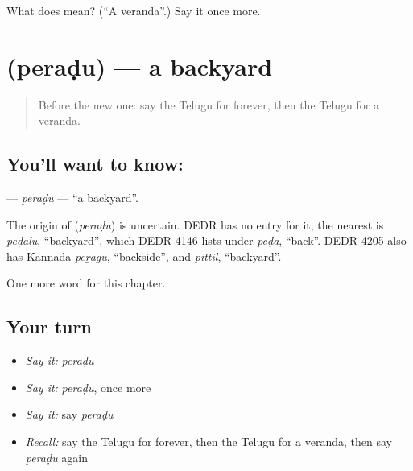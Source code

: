 \begin{tcolorbox}[breakable,colback=teal!4,colframe=teal!35!black,title={Before you move on}]
What does  mean? (\textquotedblleft{}A veranda\textquotedblright{}.) Say it once more.
\end{tcolorbox}
\section[\texorpdfstring{\te{పెరడు} (peraḍu)}{పెరడు (peraḍu)}]{ (peraḍu) — a backyard}

\label{lesson:TE-C173-peradu}



\begin{quote}
Before the new one: say the Telugu for forever, then the Telugu for a veranda.
\end{quote}

\subsection*{You'll want to know: }
\textbf{} — \emph{peraḍu} — \textquotedblleft{}a backyard\textquotedblright{}.

\begin{cousinweb}
The origin of \textbf{} (\emph{peraḍu}) is uncertain. DEDR has no entry for it; the nearest is \emph{peḍalu}, \textquotedblleft{}backyard\textquotedblright{}, which DEDR 4146 lists under \emph{peḍa}, \textquotedblleft{}back\textquotedblright{}. DEDR 4205 also has Kannada \emph{peṟagu}, \textquotedblleft{}backside\textquotedblright{}, and \emph{pittil}, \textquotedblleft{}backyard\textquotedblright{}.
\end{cousinweb}

\begin{grammarlens}[title={What you've built}]
One more word for this chapter.
\end{grammarlens}

\subsection*{Your turn}
\begin{itemize}
\raggedright
  \item \emph{Say it:} \emph{peraḍu}
  \item \emph{Say it:} \emph{peraḍu}, once more
  \item \emph{Say it:} say \emph{peraḍu}
  \item \emph{Recall:} say the Telugu for forever, then the Telugu for a veranda, then say \emph{peraḍu} again
\end{itemize}

